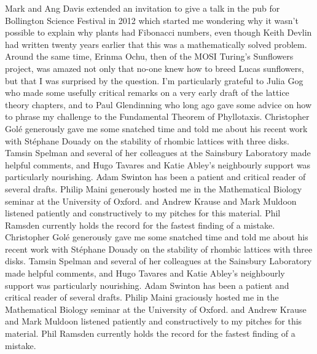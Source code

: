 


Mark and Ang Davis extended an invitation to give a talk in the pub for Bollington Science Festival in 2012 which started me wondering why it wasn't possible to explain why plants had Fibonacci numbers, even though Keith Devlin had written twenty years earlier that this was a mathematically solved problem. Around the same time, Erinma Ochu, then of the MOSI Turing's Sunflowers project, was amazed not only that no-one knew how to breed Lucas sunflowers, but that I was surprised by the question.  
I'm particularly grateful to Julia Gog who made some usefully critical remarks on a very early draft of the lattice theory chapters, and to Paul Glendinning who long ago gave some advice on how to phrase my challenge to the Fundamental Theorem of Phyllotaxis.
Christopher Golé generously gave me some snatched time and told me about his recent work with Stéphane Douady on the stability of rhombic lattices with three disks. Tamsin Spelman and several of her colleagues at the Sainsbury Laboratory made helpful comments, and Hugo Tavares and Katie Abley's neighbourly support was particularly nourishing. Adam Swinton has been a patient and critical reader of several drafts.   Philip Maini generously hosted me in the Mathematical Biology seminar at the University of Oxford. and Andrew Krause and Mark Muldoon listened patiently and constructively to my pitches for this material. Phil Ramsden currently holds the record for the fastest finding of a mistake. 
Christopher Golé generously gave me some snatched time and told me about his recent work with Stéphane Douady on the stability of rhombic lattices with three disks. Tamsin Spelman and several of her colleagues at the Sainsbury Laboratory made helpful comments, and Hugo Tavares and Katie Abley's neighbourly support was particularly nourishing. Adam Swinton has been a patient and critical reader of several drafts.   Philip Maini graciously hosted me in the Mathematical Biology seminar at the University of Oxford. and Andrew Krause and Mark Muldoon listened patiently and constructively to my pitches for this material. Phil Ramsden currently holds the record for the fastest finding of a mistake.  

